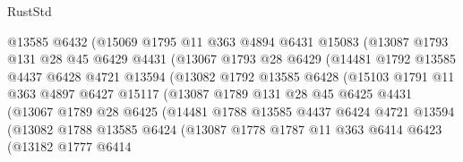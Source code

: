 \begin{lexlean}{RustStd}
\begin{coremodule}
                    @13585
                    @6432
                    (@15069
                      @1795
                      @11
                      @363
                      @4894
                      @6431
                      @15083
                      (@13087
                        @1793
                        @131
                        @28
                        @45
                        @6429
                        @4431
                        (@13067
                          @1793
                          @28
                          @6429
                          (@14481
                            @1792
                            @13585
                            @4437
                            @6428
                            @4721
                            @13594
                            (@13082
                              @1792
                              @13585
                              @6428
                              (@15103
                                @1791
                                @11
                                @363
                                @4897
                                @6427
                                @15117
                                (@13087
                                  @1789
                                  @131
                                  @28
                                  @45
                                  @6425
                                  @4431
                                  (@13067
                                    @1789
                                    @28
                                    @6425
                                    (@14481
                                      @1788
                                      @13585
                                      @4437
                                      @6424
                                      @4721
                                      @13594
                                      (@13082
                                        @1788
                                        @13585
                                        @6424
                                        (@13087
                                          @1778
                                          @1787
                                          @11
                                          @363
                                          @6414
                                          @6423
                                          (@13182
                                            @1777
                                            @6414

\end{coremodule}
\end{lexlean}
